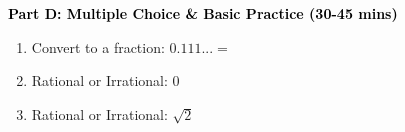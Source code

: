 \documentclass[12pt, letterpaper, fleqn]{article}
\newcommand{\blank}{\underline{\hspace{2.2cm}}}
\begin{document}
\newpage

\begin{tcolorbox}[colback=customteal!20]
\large\textcolor{black}{\textbf{Part D: Multiple Choice \& Basic Practice (30-45 mins)}}
\end{tcolorbox}

\vspace{3mm}

\begin{enumerate}[itemsep=2.5cm, leftmargin=0.6cm, resume]
\item Convert to a fraction: $0.111... = $ \blank
\item Rational or Irrational: $0$ \blank
\item Rational or Irrational: $\sqrt{2}$ \blank
\end{enumerate}
\end{document}
